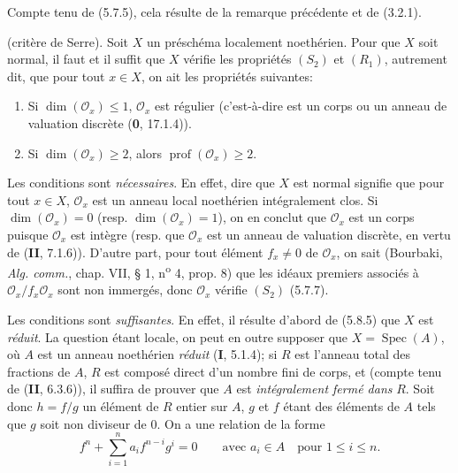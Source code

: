 Compte tenu de (5.7.5), cela résulte de la remarque précédente et de (3.2.1).

\begin{theorem}[5.8.6]
(critère de Serre). Soit $X$ un préschéma localement noethérien. Pour que
$X$ soit normal, il faut et il suffit que $X$ vérifie les propriétés $(S_2)$
et $(R_1)$, autrement dit, que pour tout $x\in X$, on ait les propriétés
suivantes:
\begin{enumerate}
\item[\textup{(i)}] Si $\dim(\mathcal O_x)\leq1$, $\mathcal O_x$ est régulier
\textup{(c'est-à-dire est un} corps \textup{ou un} anneau de valuation discrète \textup{(\textbf{0}, 17.1.4))}.
\item[\textup{(ii)}] Si $\dim(\mathcal O_x)\geq2$, alors
$\operatorname{prof}(\mathcal O_x)\geq2$.
\end{enumerate}
\end{theorem}

Les conditions sont \emph{nécessaires}. En effet, dire que $X$ est normal signifie
que pour tout $x\in X$, $\mathcal O_x$ est un anneau local noethérien
intégralement clos. Si $\dim(\mathcal O_x)=0$ (resp.
$\dim(\mathcal O_x)=1$), on en conclut que $\mathcal O_x$ est un corps
puisque $\mathcal O_x$ est intègre (resp. que $\mathcal O_x$ est un anneau
de valuation discrète, en vertu de (\textbf{II}, 7.1.6)). D'autre part, pour tout
élément $f_x\neq0$ de $\mathcal O_x$, on sait (Bourbaki, \emph{Alg. comm.},
chap. VII, § 1, n\textsuperscript{o} 4, prop. 8) que les idéaux premiers associés à
$\mathcal O_x/f_x\mathcal O_x$ sont non immergés, donc $\mathcal O_x$
vérifie $(S_2)$ (5.7.7).

Les conditions sont \emph{suffisantes}. En effet, il résulte d'abord de (5.8.5) que
$X$ est \emph{réduit}. La question étant locale, on peut en outre supposer que
$X=\operatorname{Spec}(A)$, où $A$ est un anneau noethérien \emph{réduit}
(\textbf{I}, 5.1.4); si $R$ est l'anneau total des fractions de $A$, $R$ est composé
direct d'un nombre fini de corps, et (compte tenu de (\textbf{II}, 6.3.6)), il suffira
de prouver que $A$ est \emph{intégralement fermé dans} $R$. Soit donc $h=f/g$ un
élément de $R$ entier sur $A$, $g$ et $f$ étant des éléments de $A$ tels que
$g$ soit non diviseur de 0. On a une relation de la forme
\begin{equation}
f^n+\sum_{i=1}^n a_i f^{n-i}g^i=0
\qquad\text{avec }a_i\in A\quad\text{pour }1\leq i\leq n.
\tag{5.8.6.1}\label{IV.2.s5.8.6.1-fr}
\end{equation}

